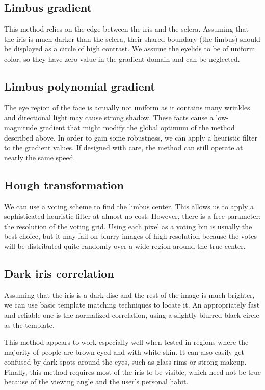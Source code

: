 \subsection{Limbus gradient}
This method relies on the edge between the iris and the sclera.
Assuming that the iris is much darker than the sclera, their shared boundary (the limbus) should be displayed as a circle of high contrast.
We assume the eyelids to be of uniform color, so they have zero value in the gradient domain and can be neglected.

\subsection{Limbus polynomial gradient}
The eye region of the face is actually not uniform as it contains many wrinkles and directional light may cause strong shadow.
These facts cause a low-magnitude gradient that might modify the global optimum of the method described above.
In order to gain some robustness, we can apply a heuristic filter to the gradient values.
If designed with care, the method can still operate at nearly the same speed.

\subsection{Hough transformation}
We can use a voting scheme to find the limbus center.
This allows us to apply a sophisticated heuristic filter at almost no cost.
However, there is a free parameter: the resolution of the voting grid.
Using each pixel as a voting bin is usually the best choice, but it may fail on blurry images of high resolution because the votes will be distributed quite randomly over a wide region around the true center.

\subsection{Dark iris correlation}
Assuming that the iris is a dark disc and the rest of the image is much brighter, we can use basic template matching techniques to locate it.
An appropriately fast and reliable one is the normalized correlation, using a slightly blurred black circle as the template.

This method appears to work especially well when tested in regions where the majority of people are brown-eyed and with white skin.
It can also easily get confused by dark spots around the eyes, such as glass rims or strong makeup.
Finally, this method requires most of the iris to be visible, which need not be true because of the viewing angle and the user's personal habit.

